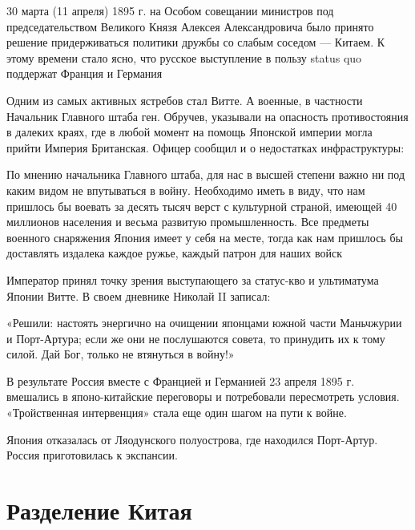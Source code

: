 \begin{textcitation} 
30 марта (11 апреля) 1895 г. на Особом совещании министров под председательством Великого Князя Алексея Александровича было принято решение придерживаться политики дружбы со слабым соседом — Китаем. К этому времени стало ясно, что русское выступление в пользу status quo поддержат Франция и Германия
\end{textcitation}

Одним из самых активных ястребов стал Витте. А военные, в частности Начальник Главного штаба ген. Обручев, указывали на опасность противостояния в далеких краях, где в любой момент на помощь Японской империи могла прийти Империя Британская. Офицер сообщил и о недостатках инфраструктуры:

\begin{textcitation} 
По мнению начальника Главного штаба, для нас в высшей степени важно ни под каким видом не впутываться в войну. Необходимо иметь в виду, что нам пришлось бы воевать за десять тысяч верст с культурной страной, имеющей 40 миллионов населения и весьма развитую промышленность. Все предметы военного снаряжения Япония имеет у себя на месте, тогда как нам пришлось бы доставлять издалека каждое ружье, каждый патрон для наших войск
\end{textcitation}

Император принял точку зрения выступающего за статус-кво и ультиматума Японии Витте. В своем дневнике Николай II записал:
\begin{textcitation}  «Решили: настоять энергично на очищении японцами южной части Маньчжурии и Порт-Артура; если же они не послушаются совета, то принудить их к тому силой. Дай Бог, только не втянуться в войну!»
\end{textcitation}

В результате Россия вместе с Францией и Германией 23 апреля 1895 г. вмешались в японо-китайские переговоры и потребовали пересмотреть условия. «Тройственная интервенция» стала еще один шагом на пути к войне.

Япония отказалась от Ляодунского полуострова, где находился Порт-Артур. Россия приготовилась к экспансии.

\section{Разделение Китая}

